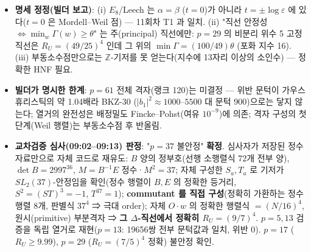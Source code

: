 \begin{itemize}
  \textbf{빌더 A·B 최종 보고(09:06) --- 정수 연산 인증서}: 두 빌더가 독립적으로 \(\Lambda=\mathbb Z[G]v_0\) 의 정확한 \(\mathbb Z\)-기저와 정수 Gram 행렬 \(B,E\) 를 구성(A: 정확한 adjugate + HNF + 소수 지수 사슬; B: Borel 부분격자 \(\mathbb Z[\zeta]^2\) 로부터 HNF 폐포; \(S,T,\eta\) 의 정수 행렬에 대해 \(S^2=(ST)^3=-1\), \(T^p=1\), \(\eta^2=p\) 를 정확히 확인). 구조적 사실(정확, \(p=5,13,29,37,61\)): \(\det_B\Lambda=(r^2p)^{p-1}\), \(O=\mathrm{End}_G(\Lambda)\) 는 이미 극대, \(t=\pm\log\varepsilon\) 의 원소 \(Q=(ypB+xE)/(2rp)\) (\(\varepsilon=\tfrac{x+y\sqrt p}2\))는 정확히 정수인 짝 unimodular 격자. \textbf{\(p=37\) 위반 벡터}: \(b=w^TBw=1026\), \(e=w^TEw=5994\), \(N=37b^2-e^2=3020976<D(p-1)^2=3884112\) (정수 부등식), \(\det_B(O\cdot w)=188811^4=(N/16)^4\) (정확), \(O\cdot w\) 는 포화(지수 1) ⇒ \textbf{정확히 \(R_U=(9/7)^4=6561/2401\)}. \(C_3\)-고정 부분격자에서 전수: \(\min\Gamma/\theta=7/9\) 정확, 위반 벡터는 \(\pm\varepsilon^{\mathbb Z}\) 를 법으로 72개. 전체 랭크 72 격자의 전역 최소가 \(7/9\) 인지는 미증명(BKZ 20/30/40 탐색에서 더 작은 값 없음).
\item
  \textbf{명세 정정(빌더 보고)}: (i) \(E_8\)/Leech 는 \(\alpha=\beta\) (\(t=0\))가 아니라 \(t=\pm\log\varepsilon\) 에 있다(\(t=0\) 은 Mordell--Weil 점) --- 11회차 T1 과 일치. (ii) "직선 안정성 \(\iff\min_w\Gamma(w)\ge\theta\)" 는 주(principal) 직선에만: \(p=29\) 의 비분리 위수 5 고정직선은 \(R_U=(49/25)^4\) 인데 그 위의 \(\min\Gamma=(100/49)\theta\) (포화 지수 16). (iii) 부동소수점만으로는 \(\mathbb Z\)-기저를 못 얻는다(지수에 13자리 이상의 소인수) --- 정확한 HNF 필요.
\item
  \textbf{빌더가 명시한 한계}: \(p=61\) 전체 격자(랭크 120)는 미결정 --- 위반 문턱이 가우스 휴리스틱의 약 1.04배라 BKZ-30 (\(|b_1|^2\approx1000\)--\(5500\) 대 문턱 900)으로는 닿지 않는다; 열거의 완전성은 배정밀도 Fincke--Pohst(여유 \(10^{-9}\))에 의존; 격자 구성의 첫 단계(Weil 행렬)는 부동소수점 후 반올림.
\item
  \textbf{교차검증 심사(09:02--09:13) 판정}: "\(p=37\) 불안정" \textbf{확정}. 심사자가 저장된 정수 자료만으로 자체 코드로 재유도: \(B\) 양의 정부호(선행 소행렬식 72개 전부 양), \(\det B=2997^{36}\), \(M=B^{-1}E\) 정수·\(M^2=37\); 자체 구성한 \(S_a,T_a\) 로 기저가 \(SL_2(37)\)-안정임을 확인(정수 행렬이 \(B,E\) 의 정확한 등거리, \(S^2=(ST)^3=-1\), \(T^{37}=1\)); \textbf{commutant 를 직접 구성}(정확히 가환하는 정수 행렬 8개, 판별식 \(37^4\) ⇒ 극대 order); 자체 \(O\cdot w\) 의 정확한 행렬식 \(=(N/16)^4\), 원시(primitive) 부분격자 ⇒ \textbf{그 \(\Delta\)-직선에서 정확히 \(R_U=(9/7)^4\)}. \(p=5,13\) 검증을 독립 열거로 재현(\(p=13\): 19656쌍 전부 문턱값과 일치, 위반 0). \(p=17\) (\(R_U\ge9.99\)), \(p=29\) (\(R_U=(7/5)^4\) 정확) 불안정 확인.

\end{itemize}
